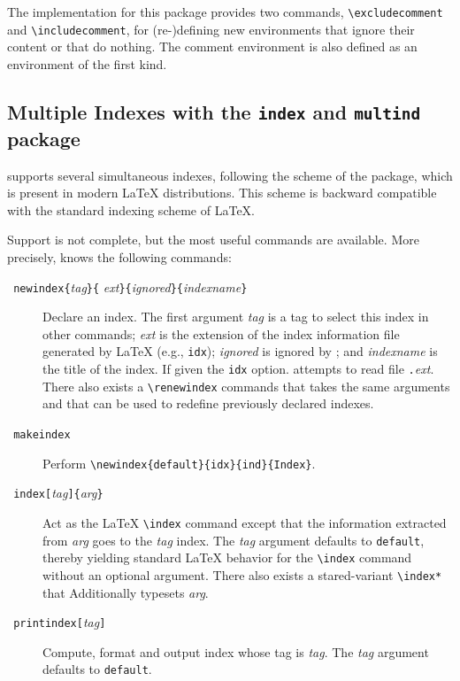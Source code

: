 The implementation for this package provides two commands,
\verb+\excludecomment+ and \verb+\includecomment+, for (re-)defining
new environments that ignore their content or that do nothing. The
comment environment is also defined as an environment of the first
kind.

\subsection{Multiple Indexes with the \texttt{index} and
\texttt{multind}\label{multind} package}
%
\hevea{} supports several simultaneous indexes, following the scheme
of the
 package,
which is present in modern \LaTeX{} distributions.
This scheme is backward compatible with the standard indexing scheme
of \LaTeX.

Support is not complete, but the most useful commands are available.
More precisely, \hevea{} knows the following commands:
\begin{description}
\item[{\tt{} newindex\{}{\it tag}{\tt \}\{}{\it
ext}{\tt\}\{}{\it ignored}{\tt\}\{}{\it indexname}{\tt\}}]
Declare an index.
The first argument {\it tag} is a tag to select this index in other
commands; {\it ext} is the extension of the index information file
generated by \LaTeX{} (e.g., \texttt{idx}); {\it ignored} is ignored by
\hevea{}; and {\it indexname} is the title of the index.
If given the \verb+idx+ option. \hevea{} attempts to read file
\texttt{.}{\it ext}. There also exists a
\verb+\renewindex+ commands that takes the same arguments and that can be
used to redefine previously declared indexes.
\item[{\tt{} makeindex}] Perform
\verb+\newindex{default}{idx}{ind}{Index}+.
\item[{\tt{} index[}{\it tag}{\tt]\{}{\it arg}{\tt\}}]
Act as the \LaTeX{} \verb+\index+ command except that the information
extracted from {\it arg} goes to the {\it tag} index.
The {\it tag} argument defaults to \verb+default+, thereby yielding
standard \LaTeX{} behavior for the \verb+\index+ command without an
optional argument.
There also exists a stared-variant \verb+\index*+ that Additionally
typesets {\it arg}.
\item[{\tt{} printindex[}{\it tag}{\tt]}] Compute, format and
output index whose tag is \textit{tag}. The {\it tag} argument
defaults to \verb+default+.
\end{description}


